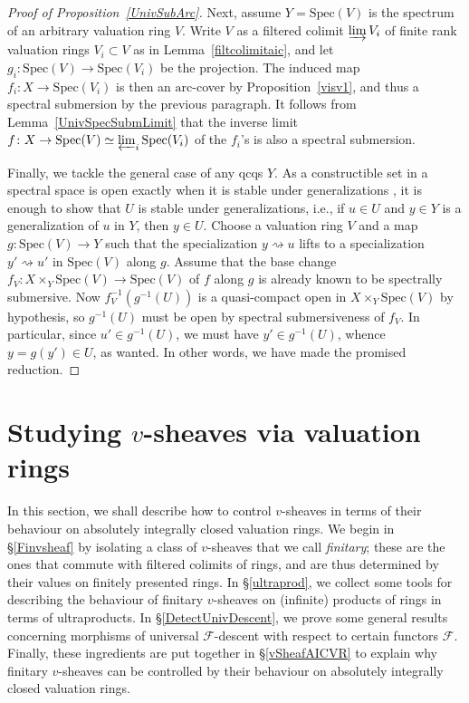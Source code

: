 \documentclass[reqno]{amsart}
\newcommand{\arc}{\mathrm{arc}}
\theoremstyle{definition}
\begin{document}
\begin{proof}[Proof of Proposition~\ref{UnivSubArc}]
Next, assume $Y = \mathrm{Spec}(V)$ is the spectrum of an arbitrary valuation ring $V$. Write $V$ as a filtered colimit $\varinjlim V_i$ of finite rank valuation rings $V_i \subset V$ as in Lemma~\ref{filtcolimitaic}, and let $g_i\colon \mathrm{Spec}(V) \to \mathrm{Spec}(V_i)$ be the projection. The induced map $f_i\colon X \to \mathrm{Spec}(V_i)$ is then an $\arc$-cover by Proposition~\ref{visv1}, and thus a spectral submersion by the previous paragraph.  It follows from Lemma~\ref{UnivSpecSubmLimit} that the inverse limit $f\colon X \to \mathrm{Spec}(V) \simeq \varprojlim_i \mathrm{Spec}(V_i)$ of the $f_i$'s is also a spectral submersion.


Finally, we tackle the general case of any  qcqs $Y$. As a constructible set in a spectral space is open exactly when it is stable under generalizations \cite[Tag 0903]{stacks-project}, it is enough to show that $U$ is stable under generalizations, i.e., if $u \in U$ and $y \in Y$ is a generalization of $u$ in $Y$, then $y \in U$. Choose a valuation ring $V$ and a map $g\colon \mathrm{Spec}(V) \to Y$ such that the specialization $y \rightsquigarrow u$ lifts to a specialization $y' \rightsquigarrow u'$ in $\mathrm{Spec}(V)$ along $g$. Assume that the base change $f_V\colon X \times_Y \mathrm{Spec}(V) \to \mathrm{Spec}(V)$ of $f$ along $g$ is already known to be spectrally submersive. Now $f_V^{-1}(g^{-1}(U))$ is a quasi-compact open in $X \times_Y \mathrm{Spec}(V)$ by hypothesis, so $g^{-1}(U)$ must be open by spectral submersiveness of $f_V$. In particular, since $u' \in g^{-1}(U)$, we must have $y' \in g^{-1}(U)$, whence $y = g(y') \in U$, as wanted. In other words, we have made the promised reduction. 
\end{proof}




\newpage
\section{Studying $v$-sheaves via valuation rings}

In this section, we shall describe how to control $v$-sheaves in terms of their behaviour on absolutely integrally closed valuation rings. We begin in \S \ref{Finvsheaf} by isolating a class of $v$-sheaves that we call {\em finitary}; these are the ones that commute with filtered colimits of rings, and are thus determined by their values on finitely presented rings. In \S \ref{ultraprod}, we collect some tools for describing the behaviour of finitary $v$-sheaves on (infinite) products of rings in terms of ultraproducts. In \S \ref{DetectUnivDescent}, we prove some general results concerning morphisms of universal $\mathcal{F}$-descent with respect to certain functors $\mathcal{F}$. Finally, these ingredients are put together in \S \ref{vSheafAICVR} to explain why finitary $v$-sheaves can be controlled by their behaviour on absolutely integrally closed valuation rings.
\end{document}
